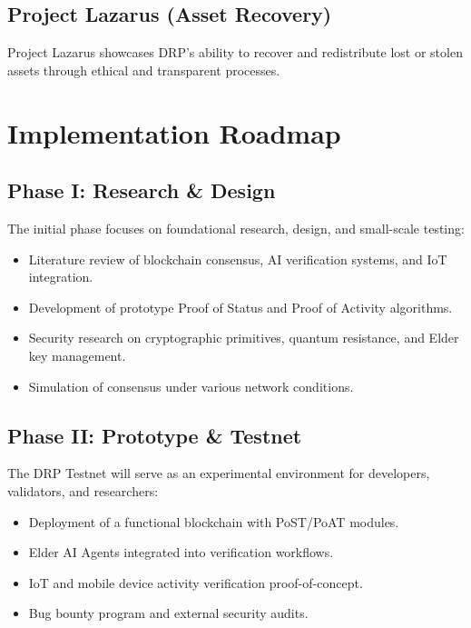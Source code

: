 \documentclass[11pt,a4paper]{article}
\begin{document}
\subsection{Project Lazarus (Asset Recovery)}
Project Lazarus showcases DRP's ability to recover and redistribute lost or stolen assets through ethical and transparent processes.


\section{Implementation Roadmap}

\subsection{Phase I: Research \& Design}
The initial phase focuses on foundational research, design, and small-scale testing:
\begin{itemize}
    \item Literature review of blockchain consensus, AI verification systems, and IoT integration.
    \item Development of prototype Proof of Status and Proof of Activity algorithms.
    \item Security research on cryptographic primitives, quantum resistance, and Elder key management.
    \item Simulation of consensus under various network conditions.
\end{itemize}

\subsection{Phase II: Prototype \& Testnet}
The DRP Testnet will serve as an experimental environment for developers, validators, and researchers:
\begin{itemize}
    \item Deployment of a functional blockchain with PoST/PoAT modules.
    \item Elder AI Agents integrated into verification workflows.
    \item IoT and mobile device activity verification proof-of-concept.
    \item Bug bounty program and external security audits.
\end{itemize}
\end{document}
